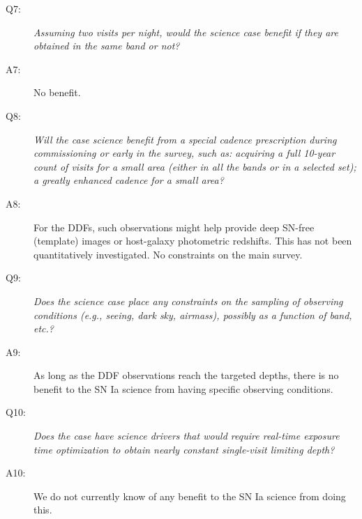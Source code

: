 \begin{description}
\item[Q7:] {\it Assuming two visits per night, would the science case
benefit if they are obtained in the same band or not?}

\item[A7:] No benefit.

\item[Q8:] {\it Will the case science benefit from a special cadence
prescription during commissioning or early in the survey, such as:
acquiring a full 10-year count of visits for a small area (either in all
the bands or in a  selected set); a greatly enhanced cadence for a small
area?}

\item[A8:] For the DDFs, such observations might help provide deep SN-free (template) images or host-galaxy photometric redshifts. This has not been quantitatively investigated. No constraints on the main survey.

\item[Q9:] {\it Does the science case place any constraints on the
sampling of observing conditions (e.g., seeing, dark sky, airmass),
possibly as a function of band, etc.?}

\item[A9:] As long as the DDF observations reach the targeted depths, there is no benefit to the SN Ia science from having specific observing conditions.

\item[Q10:] {\it Does the case have science drivers that would require
real-time exposure time optimization to obtain nearly constant
single-visit limiting depth?}

\item[A10:] We do not currently know of any benefit to the SN Ia science from doing this.

\end{description}


\navigationbar
